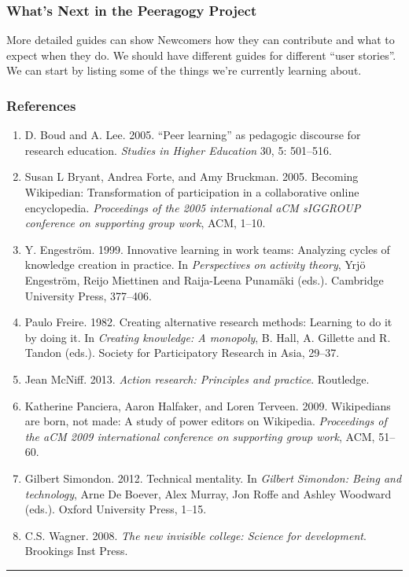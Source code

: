 \hypertarget{whats-next-in-the-peeragogy-project}{%
\subsubsection{What's Next in the Peeragogy
Project}\label{whats-next-in-the-peeragogy-project}}

More detailed guides can show {{Newcomers}} how they can contribute and
what to expect when they do. We should have different guides for
different ``user stories''. We can start by listing some of the things
we're currently learning about.

\hypertarget{references}{%
\subsubsection{References}\label{references}}

\begin{enumerate}
\def\labelenumi{\arabic{enumi}.}
\item
  D. Boud and A. Lee. 2005. ``Peer learning'' as pedagogic discourse for
  research education. \emph{Studies in Higher Education} 30, 5:
  501--516.
\item
  Susan L Bryant, Andrea Forte, and Amy Bruckman. 2005. Becoming
  Wikipedian: Transformation of participation in a collaborative online
  encyclopedia. \emph{Proceedings of the 2005 international aCM sIGGROUP
  conference on supporting group work}, ACM, 1--10.
\item
  Y. Engeström. 1999. Innovative learning in work teams: Analyzing
  cycles of knowledge creation in practice. In \emph{Perspectives on
  activity theory}, Yrjö Engeström, Reijo Miettinen and Raija-Leena
  Punamäki (eds.). Cambridge University Press, 377--406.
\item
  Paulo Freire. 1982. Creating alternative research methods: Learning to
  do it by doing it. In \emph{Creating knowledge: A monopoly}, B. Hall,
  A. Gillette and R. Tandon (eds.). Society for Participatory Research
  in Asia, 29--37.
\item
  Jean McNiff. 2013. \emph{Action research: Principles and practice}.
  Routledge.
\item
  Katherine Panciera, Aaron Halfaker, and Loren Terveen. 2009.
  Wikipedians are born, not made: A study of power editors on Wikipedia.
  \emph{Proceedings of the aCM 2009 international conference on
  supporting group work}, ACM, 51--60.
\item
  Gilbert Simondon. 2012. Technical mentality. In \emph{Gilbert
  Simondon: Being and technology}, Arne De Boever, Alex Murray, Jon
  Roffe and Ashley Woodward (eds.). Oxford University Press, 1--15.
\item
  C.S. Wagner. 2008. \emph{The new invisible college: Science for
  development}. Brookings Inst Press.
\end{enumerate}

\begin{center}\rule{0.5\linewidth}{0.5pt}\end{center}
